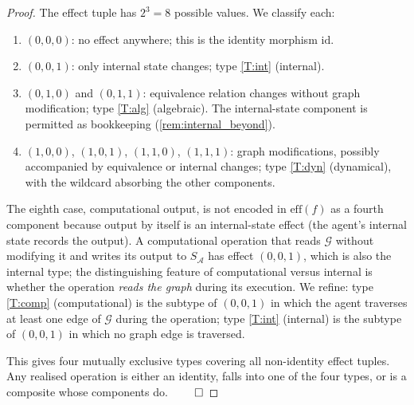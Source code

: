 \documentclass[11pt,twocolumn,a4paper]{article}
\theoremstyle{thmstyle}
\theoremstyle{definition}
\theoremstyle{remark}
\newcommand{\Graph}{\mathcal{G}}
\newcommand{\Agent}{\mathcal{A}}
\begin{document}
\begin{proof}
The effect tuple has $2^3 = 8$ possible values. We classify each:
\begin{enumerate}[nosep,leftmargin=*]
\item $(0,0,0)$: no effect anywhere; this is the identity morphism
$\mathrm{id}$.
\item $(0,0,1)$: only internal state changes; type \ref{T:int}
(internal).
\item $(0,1,0)$ and $(0,1,1)$: equivalence relation changes
without graph modification; type \ref{T:alg} (algebraic). The
internal-state component is permitted as bookkeeping
(\cref{rem:internal_beyond}).
\item $(1,0,0)$, $(1,0,1)$, $(1,1,0)$, $(1,1,1)$: graph
modifications, possibly accompanied by equivalence or internal
changes; type \ref{T:dyn} (dynamical), with the wildcard absorbing
the other components.
\end{enumerate}
The eighth case, computational output, is not encoded in
$\mathrm{eff}(f)$ as a fourth component because output by itself
is an internal-state effect (the agent's internal state records the
output). A computational operation that reads $\Graph$ without
modifying it and writes its output to $S_\Agent$ has effect
$(0,0,1)$, which is also the internal type; the distinguishing
feature of computational versus internal is whether the operation
\emph{reads the graph} during its execution. We refine: type
\ref{T:comp} (computational) is the subtype of $(0,0,1)$ in which
the agent traverses at least one edge of $\Graph$ during the
operation; type \ref{T:int} (internal) is the subtype of $(0,0,1)$
in which no graph edge is traversed.

This gives four mutually exclusive types covering all
non-identity effect tuples. Any realised operation is either an
identity, falls into one of the four types, or is a composite
whose components do. $\qed$
\end{proof}
\end{document}

